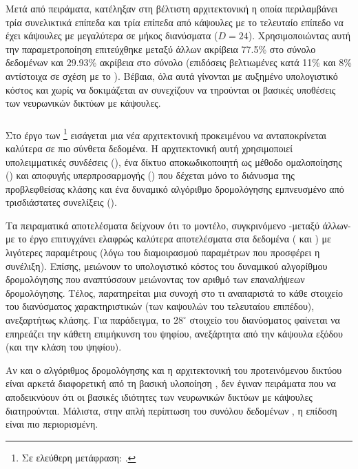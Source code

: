 Μετά από πειράματα, κατέληξαν στη βέλτιστη αρχιτεκτονική η οποία περιλαμβάνει τρία συνελικτικά επίπεδα και τρία επίπεδα από κάψουλες με το τελευταίο επίπεδο να έχει κάψουλες με μεγαλύτερα σε μήκος διανύσματα ($D=24$). Χρησιμοποιώντας αυτή την παραμετροποίηση επιτεύχθηκε μεταξύ άλλων ακρίβεια 77.5\% στο σύνολο δεδομένων  και 29.93\% ακρίβεια στο σύνολο  (επιδόσεις βελτιωμένες κατά 11\% και 8\% αντίστοιχα σε σχέση με το \cite{sabour2017dynamic}). Βέβαια, όλα αυτά γίνονται με αυξημένο υπολογιστικό κόστος και χωρίς να δοκιμάζεται αν συνεχίζουν να τηρούνται οι βασικές υποθέσεις των νευρωνικών δικτύων με κάψουλες.

\subsubsection{}

Στο έργο των  \footnote{Σε ελεύθερη μετάφραση: .} \cite{rajasegaran2019deepcaps} εισάγεται μια νέα αρχιτεκτονική προκειμένου να ανταποκρίνεται καλύτερα σε πιο σύνθετα δεδομένα. Η αρχιτεκτονική αυτή χρησιμοποιεί υπολειμματικές συνδέσεις (), ένα δίκτυο αποκωδικοποιητή ως μέθοδο ομαλοποίησης () και αποφυγής υπερπροσαρμογής () που δέχεται μόνο το διάνυσμα της προβλεφθείσας κλάσης και ένα δυναμικό αλγόριθμο δρομολόγησης εμπνευσμένο από τρισδιάστατες συνελίξεις (). \par

Τα πειραματικά αποτελέσματα δείχνουν ότι το μοντέλο, συγκρινόμενο -μεταξύ άλλων- με το έργο \cite{sabour2017dynamic} επιτυγχάνει ελαφρώς καλύτερα αποτελέσματα στα δεδομένα ( και ) με λιγότερες παραμέτρους (λόγω του διαμοιρασμού παραμέτρων που προσφέρει η συνέλιξη). Επίσης, μειώνουν το υπολογιστικό κόστος του δυναμικού αλγορίθμου δρομολόγησης που αναπτύσσουν μειώνοντας τον αριθμό των επαναλήψεων δρομολόγησης. Τέλος, παρατηρείται μια συνοχή στο τι αναπαριστά το κάθε στοιχείο του διανύσματος χαρακτηριστικών (των καψουλών του τελευταίου επιπέδου), ανεξαρτήτως κλάσης. Για παράδειγμα, το $28^\circ$ στοιχείο του διανύσματος φαίνεται να επηρεάζει την κάθετη επιμήκυνση του ψηφίου, ανεξάρτητα από την κάψουλα εξόδου (και την κλάση του ψηφίου). \par

Αν και ο αλγόριθμος δρομολόγησης και η αρχιτεκτονική του προτεινόμενου δικτύου είναι αρκετά διαφορετική από τη βασική υλοποίηση \cite{sabour2017dynamic}, δεν έγιναν πειράματα που να αποδεικνύουν ότι οι βασικές ιδιότητες των νευρωνικών δικτύων με κάψουλες διατηρούνται. Μάλιστα, στην απλή περίπτωση του συνόλου δεδομένων , η επίδοση είναι πιο περιορισμένη.

